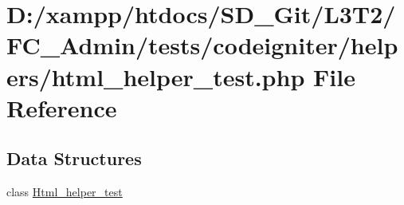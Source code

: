 \hypertarget{_admin_2tests_2codeigniter_2helpers_2html__helper__test_8php}{}\section{D\+:/xampp/htdocs/\+S\+D\+\_\+\+Git/\+L3\+T2/\+F\+C\+\_\+\+Admin/tests/codeigniter/helpers/html\+\_\+helper\+\_\+test.php File Reference}
\label{_admin_2tests_2codeigniter_2helpers_2html__helper__test_8php}
\subsection*{Data Structures}
\begin{DoxyCompactItemize}
\item 
class \hyperlink{class_html__helper__test}{Html\+\_\+helper\+\_\+test}
\end{DoxyCompactItemize}

